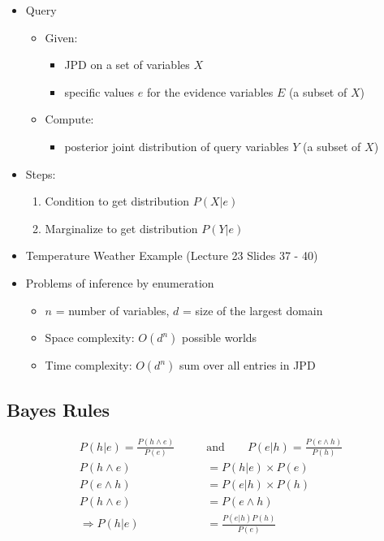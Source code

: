 \documentclass{article}
\begin{document}
\begin{itemize}
    \item Query
        \begin{itemize}
            \item Given:
                \begin{itemize}
                    \item JPD on a set of variables $X$
                    \item specific values $e$ for the evidence variables $E$ (a subset of $X$)
                \end{itemize}
            \item Compute:
                \begin{itemize}
                    \item posterior joint distribution of query variables $Y$ (a subset of $X$)
                \end{itemize}
        \end{itemize}
    \item Steps:
        \begin{enumerate}
            \item Condition to get distribution $P(X|e)$
            \item Marginalize to get distribution $P(Y|e)$
        \end{enumerate}
    \item Temperature Weather Example (Lecture 23 Slides 37 - 40)
    \item Problems of inference by enumeration
        \begin{itemize}
            \item $n$ = number of variables, $d$ = size of the largest domain
            \item Space complexity: $O(d^n)$ possible worlds
            \item Time complexity: $O(d^n)$ sum over all entries in JPD
        \end{itemize}
\end{itemize}

\subsection{Bayes Rules}

\begin{align*}
    P(h|e) = \frac{P(h \wedge e)}{P(e)} \qquad &\text{and} \qquad P(e|h) = \frac{P(e \wedge h)}{P(h)} \\
    P(h \wedge e) &= P(h|e) \times P(e) \\
    P(e \wedge h) &= P(e|h) \times P(h) \\
    P(h \wedge e) &= P(e \wedge h) \\
    \Rightarrow P(h|e) &= \frac{P(e|h)P(h)}{P(e)}
\end{align*}
\end{document}
